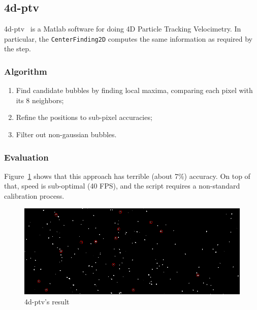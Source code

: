 \subsection{4d-ptv}
\label{sec:locate:fourdptv}

4d-ptv~\cite{fourdptv} is a Matlab software for doing 4D Particle Tracking Velocimetry.
In particular, the \texttt{CenterFinding2D} computes the same information as required by the \locate* step.

\subsubsection{Algorithm}

\begin{enumerate}
	\itemsep 0em
	\item Find candidate bubbles by finding local maxima, comparing each pixel with its 8 neighbors;
	\item Refine the positions to sub-pixel accuracies;
	\item Filter out non-gaussian bubbles.
\end{enumerate}

\subsubsection{Evaluation}

Figure~\ref{fig:locate:fourdptv} shows that this approach has terrible (about 7\%) accuracy.
On top of that, speed is sub-optimal (40 FPS), and the script requires a non-standard calibration process.

\begin{figure}
	\centerline{\includegraphics[width=\locateimgsize]{images/locate/4d-ptv.png}}
	\caption{\centering 4d-ptv's result}
	\label{fig:locate:fourdptv}
\end{figure}

